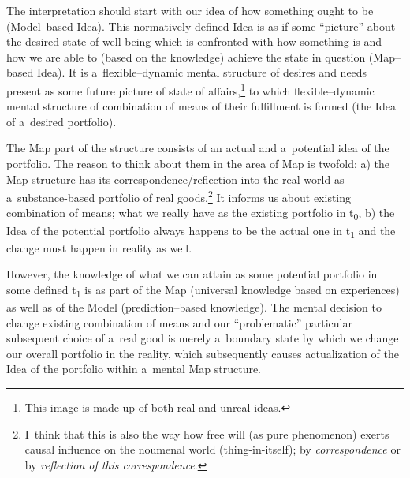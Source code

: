 The interpretation should start with our idea of how something ought to be (Model–based Idea). This normatively defined Idea is as if some ``picture'' about the desired state of well-being which is confronted with how something is and how we are able to (based on the knowledge) achieve the state in question (Map–based Idea). It is a~flexible–dynamic mental structure of desires and needs present as some future picture of state of affairs,\footnote{This image is made up of both real and unreal ideas.} to which flexible–dynamic mental structure of combination of means of their fulfillment is formed (the Idea of a~desired portfolio).



The Map part of the structure consists of an actual and a~potential idea of the portfolio. The reason to think about them in the area of Map is twofold: a) the Map structure has its correspondence/reflection into the real world as a~substance-based portfolio of real goods.\footnote{I~think that this is also the way how free will (as pure phenomenon) exerts causal influence on the noumenal world (thing-in-itself); by \textit{correspondence} or by \textit{reflection of this correspondence}.} It informs us about existing combination of means; what we really have as the existing portfolio in t\textsubscript{0}, b) the Idea of the potential portfolio always happens to be the actual one in t\textsubscript{1} and the change must happen in reality as well.



However, the knowledge of what we can attain as some potential portfolio in some defined t\textsubscript{1 }is as part of the Map (universal knowledge based on experiences) as well as of the Model (prediction–based knowledge). The mental decision to change existing combination of means and our ``problematic'' particular subsequent choice of a~real good is merely a~boundary state by which we change our overall portfolio in the reality, which subsequently causes actualization of the Idea of the portfolio within a~mental Map structure.



